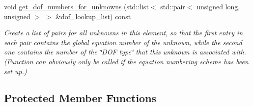 \begin{DoxyCompactItemize}
void \hyperlink{classoomph_1_1AxisymmetricTTaylorHoodElement_a3f1f37c74e194ae5770d9928c9a0e409}{get\+\_\+dof\+\_\+numbers\+\_\+for\+\_\+unknowns} (std\+::list$<$ std\+::pair$<$ unsigned long, unsigned $>$ $>$ \&dof\+\_\+lookup\+\_\+list) const
\begin{DoxyCompactList}\small\item\em Create a list of pairs for all unknowns in this element, so that the first entry in each pair contains the global equation number of the unknown, while the second one contains the number of the \char`\"{}\+D\+O\+F type\char`\"{} that this unknown is associated with. (Function can obviously only be called if the equation numbering scheme has been set up.) \end{DoxyCompactList}\end{DoxyCompactItemize}
\subsection*{Protected Member Functions}
